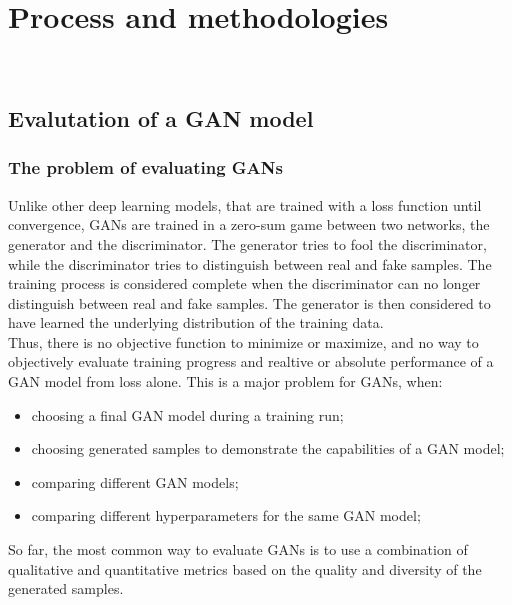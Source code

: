 \chapter{Process and methodologies}
\label{cap:process-methodologies}

\\

\section{Evalutation of a GAN model}
\label{sec:evalutation-gan-model}
\subsection{The problem of evaluating GANs}
\label{subsec:problem-evaluating-gans}
Unlike other deep learning models, that are trained with a loss function until convergence, GANs are trained in a zero-sum game between two networks, the generator and the discriminator. 
The generator tries to fool the discriminator, while the discriminator tries to distinguish between real and fake samples. 
The training process is considered complete when the discriminator can no longer distinguish between real and fake samples. 
The generator is then considered to have learned the underlying distribution of the training data.\\
Thus, there is no objective function to minimize or maximize, and no way to objectively evaluate training progress and realtive or absolute performance of a GAN model from loss alone.
This is a major problem for GANs, when:
\begin{itemize}
    \item choosing a final GAN model during a training run;
    \item choosing generated samples to demonstrate the capabilities of a GAN model;
    \item comparing different GAN models;
    \item comparing different hyperparameters for the same GAN model;
\end{itemize}
So far, the most common way to evaluate GANs is to use a combination of qualitative and quantitative metrics based on the quality and diversity of the generated samples.
